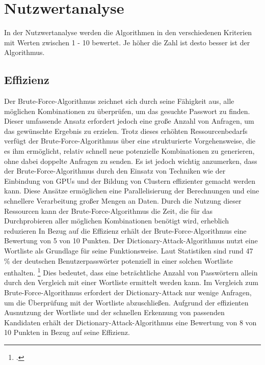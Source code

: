 \section{Nutzwertanalyse}
In der Nutzwertanalyse werden die Algorithmen in den verschiedenen Kriterien mit Werten zwischen 1 - 10 bewertet. Je höher die Zahl ist desto besser ist der Algorithmus. 
\subsection{Effizienz}
Der Brute-Force-Algorithmus zeichnet sich durch seine Fähigkeit aus, alle möglichen Kombinationen zu überprüfen, um das gesuchte Passwort zu finden. 
Dieser umfassende Ansatz erfordert jedoch eine große Anzahl von Anfragen, um das gewünschte Ergebnis zu erzielen.
Trotz dieses erhöhten Ressourcenbedarfs verfügt der Brute-Force-Algorithmus über eine strukturierte Vorgehensweise, die es ihm ermöglicht, 
relativ schnell neue potenzielle Kombinationen zu generieren, ohne dabei doppelte Anfragen zu senden.
Es ist jedoch wichtig anzumerken, dass der Brute-Force-Algorithmus durch den Einsatz von Techniken wie der Einbindung von GPUs und der Bildung von Clustern effizienter gemacht werden kann. 
Diese Ansätze ermöglichen eine Parallelisierung der Berechnungen und eine schnellere Verarbeitung großer Mengen an Daten. 
Durch die Nutzung dieser Ressourcen kann der Brute-Force-Algorithmus die Zeit, die für das Durchprobieren aller möglichen Kombinationen benötigt wird, erheblich reduzieren
In Bezug auf die Effizienz erhält der Brute-Force-Algorithmus eine Bewertung von 5 von 10 Punkten. 
Der Dictionary-Attack-Algorithmus nutzt eine Wortliste als Grundlage für seine Funktionsweise. 
Laut Statistiken sind rund 47 \% der deutschen Benutzerpasswörter potenziell in einer solchen Wortliste enthalten. \footcite{statistaerstellen}
Dies bedeutet, dass eine beträchtliche Anzahl von Passwörtern allein durch den Vergleich mit einer Wortliste ermittelt werden kann. 
Im Vergleich zum Brute-Force-Algorithmus erfordert der Dictionary-Attack nur wenige Anfragen, um die Überprüfung mit der Wortliste abzuschließen.
Aufgrund der effizienten Ausnutzung der Wortliste und der schnellen Erkennung von passenden Kandidaten erhält der Dictionary-Attack-Algorithmus eine Bewertung von 8 von 10 Punkten in Bezug auf seine Effizienz. 
